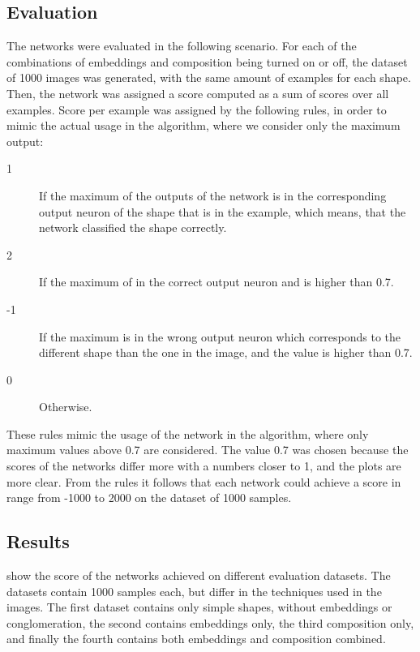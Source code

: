 \subsection{Evaluation}
The networks were evaluated in the following scenario. For each of the combinations of embeddings and composition being turned on or off, the dataset of 1000 images was generated, with the same amount of examples for each shape. Then, the network was assigned a score computed as a sum of scores over all examples. Score per example was assigned by the following rules, in order to mimic the actual usage in the algorithm, where we consider only the maximum output:

\begin{description}
\item [1] If the maximum of the outputs of the network is in the corresponding output neuron of the shape that is in the example, which means, that the network classified the shape correctly.
\item [2] If the maximum of in the correct output neuron and is higher than 0.7. 
\item [-1] If the maximum is in the wrong output neuron which corresponds to the different shape than the one in the image, and the value is higher than 0.7.
\item [0] Otherwise.
\end{description}

These rules \label{rules} mimic the usage of the network in the algorithm, where only maximum values above 0.7 are considered. The value 0.7 was chosen because the scores of the networks differ more with a numbers closer to 1, and the plots are more clear. From the rules it follows that each network could achieve a score in range from -1000 to 2000 on the dataset of 1000 samples.

\subsection{Results}
 show the score of the networks achieved on different evaluation datasets. The datasets contain 1000 samples each, but differ in the techniques used in the images. The first dataset contains only simple shapes, without embeddings or conglomeration, the second contains embeddings only, the third composition only, and finally the fourth contains both embeddings and composition combined.

